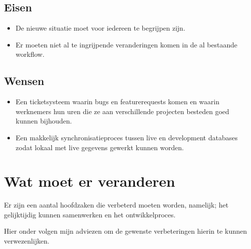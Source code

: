 \documentclass[12pt,a4paper]{article}
\begin{document}
    \subsection{Eisen}
    
    \begin{itemize}
      \item De nieuwe situatie moet voor iedereen te begrijpen zijn.
      \item Er moeten niet al te ingrijpende veranderingen komen in de al bestaande workflow.
    \end{itemize}
    
    \subsection{Wensen}
    
    \begin{itemize}
      \item Een ticketsysteem waarin bugs en featurerequests komen en waarin werknemers hun uren die ze aan verschillende projecten besteden goed kunnen bijhouden.
      \item Een makkelijk synchronisatieproces tussen live en development databases zodat lokaal met live gegevens gewerkt kunnen worden.
    \end{itemize}
  
  \section{Wat moet er veranderen}
  
  Er zijn een aantal hoofdzaken die verbeterd moeten worden, namelijk; het gelijktijdig kunnen samenwerken en het ontwikkelproces.
  
  Hier onder volgen mijn adviezen om de gewenste verbeteringen hierin te kunnen verwezenlijken.
  
\end{document}
